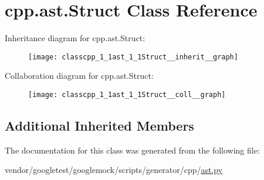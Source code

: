 \hypertarget{classcpp_1_1ast_1_1Struct}{}\section{cpp.\+ast.\+Struct Class Reference}
\label{classcpp_1_1ast_1_1Struct}


Inheritance diagram for cpp.\+ast.\+Struct\+:\nopagebreak
\begin{figure}[H]
\begin{center}
\leavevmode
\texttt{[image: classcpp\_1\_1ast\_1\_1Struct\_\_inherit\_\_graph]}
\end{center}
\end{figure}


Collaboration diagram for cpp.\+ast.\+Struct\+:\nopagebreak
\begin{figure}[H]
\begin{center}
\leavevmode
\texttt{[image: classcpp\_1\_1ast\_1\_1Struct\_\_coll\_\_graph]}
\end{center}
\end{figure}
\subsection*{Additional Inherited Members}


The documentation for this class was generated from the following file\+:\begin{DoxyCompactItemize}
\item 
vendor/googletest/googlemock/scripts/generator/cpp/\hyperlink{ast_8py}{ast.\+py}\end{DoxyCompactItemize}
